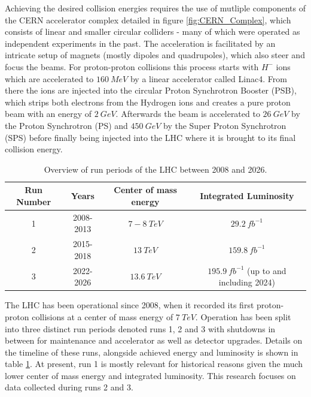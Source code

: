 Achieving the desired collision energies requires the use of mutliple components of the CERN accelerator complex 
detailed in figure \ref{fig:CERN_Complex}, which consists of linear and smaller circular colliders - many of which were 
operated as independent experiments in the past. The acceleration is facilitated by an intricate setup of magnets (mostly 
dipoles and quadrupoles), which also steer and focus the beams. For proton-proton collisions this process starts with $H^-$ 
ions which are accelerated to $160\ MeV$ by a linear accelerator called Linac4. From there the ions are injected into the 
circular Proton Synchrotron Booster (PSB), which strips both electrons from the Hydrogen ions and creates a pure proton beam 
with an energy of $2\ GeV$. Afterwards the beam is accelerated to $26\ GeV$ by the Proton Synchrotron (PS) and $450\ GeV$ by 
the Super Proton Synchrotron (SPS) before finally being injected into the LHC where it is brought to its final collision 
energy. \par

\begin{table}
\begin{center}
\caption{Overview of run periods of the LHC between 2008 and 2026.}
\label{table-lhc-runs}
\begin{tabular}{|c c c c|} 
 \hline
 Run Number & Years & Center of mass energy & Integrated Luminosity \\ [0.5ex] 
 \hline
 1 & 2008-2013 & $7-8\ TeV$ & $29.2\ fb^{-1}$ \\ 
 2 & 2015-2018 & $13\ TeV$ & $159.8\ fb^{-1}$ \\ 
 3 & 2022-2026 & $13.6\ TeV$ & $195.9\ fb^{-1}$ (up to and including 2024) \\ 
 \hline
\end{tabular}
\end{center}
\end{table}

The LHC has been operational since 2008, when it recorded its first proton-proton collisions at a center of mass energy 
of $7\ TeV$. Operation has been split into three distinct run periods denoted runs 1, 2 and 3 with shutdowns in between for 
maintenance and accelerator as well as detector upgrades. Details on the timeline of these runs, alongside achieved energy 
and luminosity is shown in table \ref{table-lhc-runs}. At present, run 1 is mostly relevant for historical reasons given the 
much lower center of mass energy and integrated luminosity. This research focuses on data collected during runs 2 and 3. \par 

